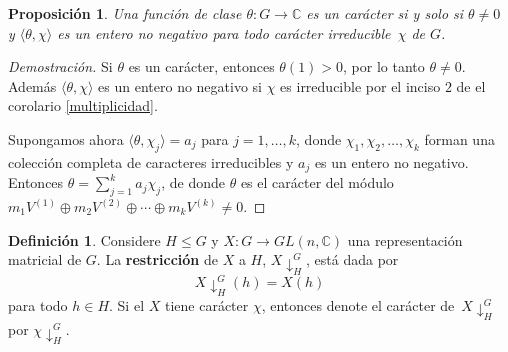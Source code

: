 \documentclass[12pt]{book}
\newtheorem{proposition}[theorem]{Proposición}
\theoremstyle{definition}
\newtheorem{definition}[theorem]{Definición}
\newcounter{in}
\newcounter{ini}
\begin{document}
\begin{proposition}
\label{fun-cla-caracter}
Una función de clase $\theta:G\rightarrow\mathbb{C}$ es un carácter si
y solo si $\theta\neq 0$ y $\langle\theta,\chi\rangle$ es un entero no
negativo para todo carácter irreducible~$\chi$ de $G$. 
\end{proposition}
\begin{proof}[Demostración]
Si $\theta$ es un carácter, entonces $\theta(1)>0$, por lo tanto
$\theta\neq 0$. Además $\langle\theta,\chi\rangle$ es un entero no
negativo si $\chi$ es irreducible por el inciso $2$ de el corolario
\ref{multiplicidad}.

Supongamos ahora $\langle\theta,\chi_{j}\rangle=a_{j}$ para
$j=1,\ldots,k$, donde $\chi_{1},\chi_{2},\ldots,\chi_{k}$ forman una
colección completa de caracteres irreducibles y $a_{j}$ es un entero
no negativo. Entonces $\theta=\sum^{k}_{j=1}a_{j}\chi_{j}$, de donde
$\theta$ es el carácter del módulo $m_{1}V^{(1)}\oplus
m_{2}V^{(2)}\oplus\cdots\oplus m_{k}V^{(k)}\neq 0$. 
\end{proof}

\begin{definition}
  Considere $H\leq G$ y $X:G\rightarrow GL(n,\mathbb{C})$ una
  representación matricial de $G$. La \textbf{restricción} de $X$ a
  $H$, $X\downarrow^{G}_{H}$, está dada por
  \begin{equation*}
    X\downarrow^{G}_{H}(h)=X(h)
  \end{equation*}
  para todo $h\in H$. Si el $X$ tiene carácter $\chi$, entonces denote
  el carácter de~$X\downarrow^{G}_{H}$ por $\chi\downarrow^{G}_{H}$.
\end{definition}
\end{document}

